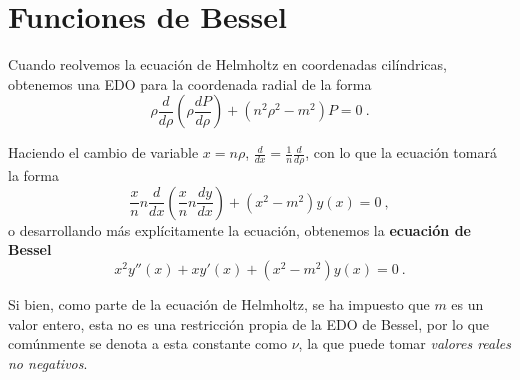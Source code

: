 \chapter{Funciones de Bessel}

Cuando reolvemos la ecuación de Helmholtz en coordenadas cilíndricas, obtenemos una EDO para la coordenada radial de la forma
\begin{equation}
    \rho \frac{d}{d\rho}\left( \rho \frac{dP}{d\rho} \right) + (n^2\rho^2 - m^2)P = 0 \ .
\end{equation}

Haciendo el cambio de variable $x = n\rho$, $\frac{d}{dx} = \frac{1}{n} \frac{d}{d\rho}$, con lo que la ecuación tomará la forma
\begin{equation}
    \frac{x}{n} n \frac{d}{dx} \left( \frac{x}{n} n \frac{dy}{dx} \right) + (x^2 - m^2)y(x) = 0 \ ,
\end{equation}
o desarrollando más explícitamente la ecuación, obtenemos la \textbf{ecuación de Bessel}
\begin{equation}
    x^2 y''(x) + x y'(x) + (x^2 - m^2) y(x) = 0 \ .
\end{equation}

Si bien, como parte de la ecuación de Helmholtz, se ha impuesto que $m$ es un valor entero, esta no es una restricción propia de la EDO de Bessel, por lo que comúnmente se denota a esta constante como $\nu$, la que puede tomar \emph{valores reales no negativos}.

